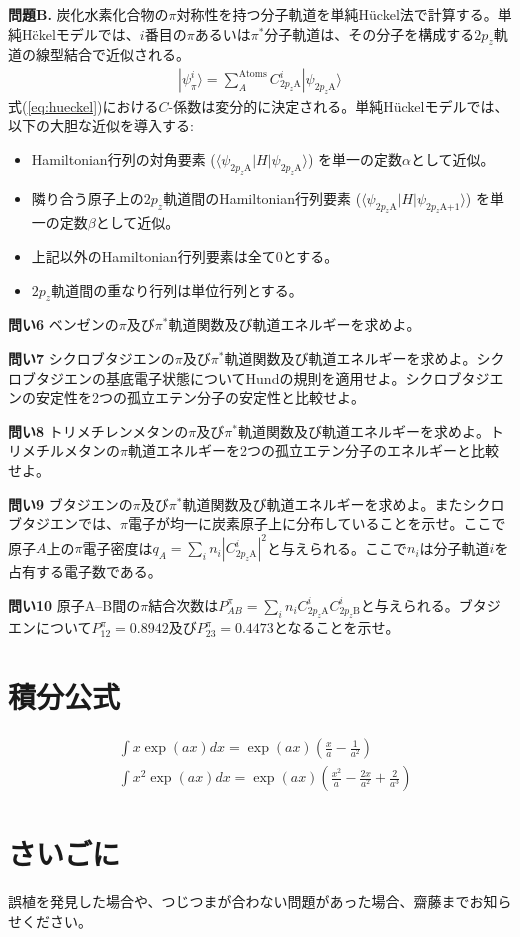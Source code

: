 \documentclass[11pt,pra,aps]{revtex4}
\begin{document}
\noindent
    {\bf 問題B.} 炭化水素化合物の$\pi$対称性を持つ分子軌道を単純H\"uckel法で計算する。単純H\"ckelモデルでは、$i$番目の$\pi$あるいは$\pi^*$分子軌道は、その分子を構成する$2p_z$軌道の線型結合で近似される。
\begin{align}
  |\psi_\pi^i\rangle=\sum_A^\text{Atoms}C^i_{2p_z\text{A}}|\psi_{2p_z\text{A}}\rangle \label{eq:hueckel}
\end{align}
式(\ref{eq:hueckel})における$C$-係数は変分的に決定される。単純H\"uckelモデルでは、以下の大胆な近似を導入する:
\begin{itemize}
\item Hamiltonian行列の対角要素 ($\langle\psi_{2p_z\text{A}}|H|\psi_{2p_z\text{A}}\rangle$) を単一の定数$\alpha$として近似。
\item 隣り合う原子上の$2p_z$軌道間のHamiltonian行列要素 ($\langle\psi_{2p_z\text{A}}|H|\psi_{2p_z\text{A+1}}\rangle$) を単一の定数$\beta$として近似。
\item 上記以外のHamiltonian行列要素は全て0とする。
\item $2p_z$軌道間の重なり行列は単位行列とする。
\end{itemize}

\noindent
{\bf 問い6} ベンゼンの$\pi$及び$\pi^*$軌道関数及び軌道エネルギーを求めよ。

\noindent
{\bf 問い7} シクロブタジエンの$\pi$及び$\pi^*$軌道関数及び軌道エネルギーを求めよ。シクロブタジエンの基底電子状態についてHundの規則を適用せよ。シクロブタジエンの安定性を2つの孤立エテン分子の安定性と比較せよ。

\noindent
{\bf 問い8} トリメチレンメタンの$\pi$及び$\pi^*$軌道関数及び軌道エネルギーを求めよ。トリメチルメタンの$\pi$軌道エネルギーを2つの孤立エテン分子のエネルギーと比較せよ。

\noindent
{\bf 問い9} ブタジエンの$\pi$及び$\pi^*$軌道関数及び軌道エネルギーを求めよ。またシクロブタジエンでは、$\pi$電子が均一に炭素原子上に分布していることを示せ。ここで原子$A$上の$\pi$電子密度は$q_A=\sum_i n_i |C^i_{2p_z\text{A}}|^2$と与えられる。ここで$n_i$は分子軌道$i$を占有する電子数である。

\noindent
{\bf 問い10} 原子A--B間の$\pi$結合次数は$P^\pi_{AB}=\sum_i n_i C^i_{2p_z\text{A}} C^i_{2p_z\text{B}}$と与えられる。ブタジエンについて$P^\pi_{12}=0.8942$及び$P^\pi_{23}=0.4473$となることを示せ。

\section{積分公式}
\begin{align}
  &\int x   \exp(ax) dx = \exp(ax)\left(\frac{x  }{a}-\frac{1}{a^2}\right) \\
  &\int x^2 \exp(ax) dx = \exp(ax)\left(\frac{x^2}{a}-\frac{2x}{a^2}+\frac{2}{a^3}\right) 
\end{align}

\section{さいごに}

誤植を発見した場合や、つじつまが合わない問題があった場合、齋藤までお知らせください。
\end{document}
